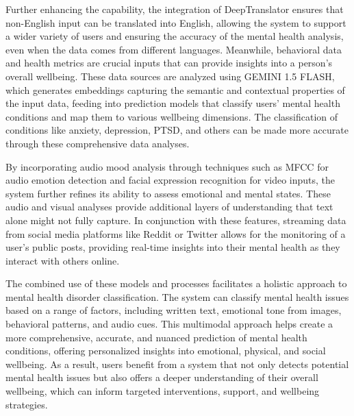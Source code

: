 \vspace{2em}

\noindent
Further enhancing the capability, the integration of DeepTranslator ensures that non-English input can be translated into English, allowing the system to support a wider variety of users and ensuring the accuracy of the mental health analysis, even when the data comes from different languages. Meanwhile, behavioral data and health metrics are crucial inputs that can provide insights into a person’s overall wellbeing. These data sources are analyzed using GEMINI 1.5 FLASH, which generates embeddings capturing the semantic and contextual properties of the input data, feeding into prediction models that classify users' mental health conditions and map them to various wellbeing dimensions. The classification of conditions like anxiety, depression, PTSD, and others can be made more accurate through these comprehensive data analyses.

\vspace{2em}

\noindent
By incorporating audio mood analysis through techniques such as MFCC for audio emotion detection and facial expression recognition for video inputs, the system further refines its ability to assess emotional and mental states. These audio and visual analyses provide additional layers of understanding that text alone might not fully capture. In conjunction with these features, streaming data from social media platforms like Reddit or Twitter allows for the monitoring of a user’s public posts, providing real-time insights into their mental health as they interact with others online.

\vspace{2em}

\noindent
The combined use of these models and processes facilitates a holistic approach to mental health disorder classification. The system can classify mental health issues based on a range of factors, including written text, emotional tone from images, behavioral patterns, and audio cues. This multimodal approach helps create a more comprehensive, accurate, and nuanced prediction of mental health conditions, offering personalized insights into emotional, physical, and social wellbeing. As a result, users benefit from a system that not only detects potential mental health issues but also offers a deeper understanding of their overall wellbeing, which can inform targeted interventions, support, and wellbeing strategies.



